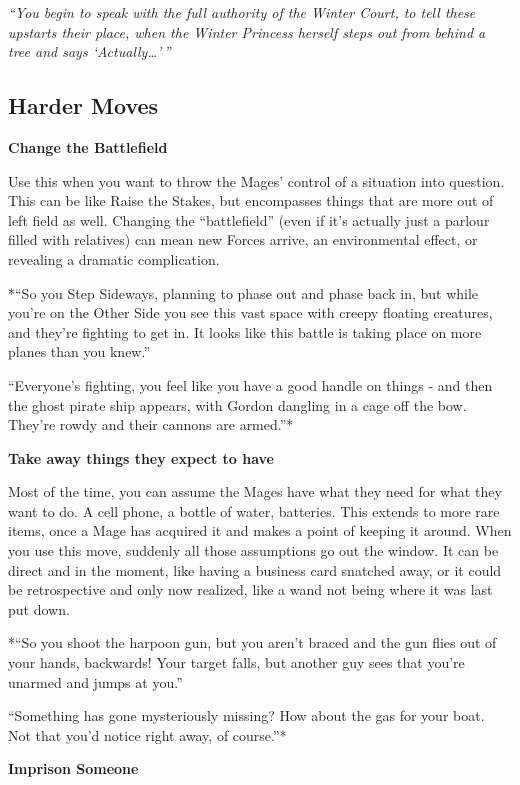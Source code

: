 \documentclass[10pt,twoside,openright]{memoir}
\begin{document}
\emph{``You begin to speak with the full authority of the Winter Court,
to tell these upstarts their place, when the Winter Princess herself
steps out from behind a tree and says `Actually\ldots{}'\,''}

\hypertarget{harder-moves}{%
\subsection{Harder Moves}\label{harder-moves}}

\textbf{Change the Battlefield}

Use this when you want to throw the Mages' control of a situation into
question. This can be like Raise the Stakes, but encompasses things that
are more out of left field as well. Changing the ``battlefield'' (even
if it's actually just a parlour filled with relatives) can mean new
Forces arrive, an environmental effect, or revealing a dramatic
complication.

*``So you Step Sideways, planning to phase out and phase back in, but
while you're on the Other Side you see this vast space with creepy
floating creatures, and they're fighting to get in. It looks like this
battle is taking place on more planes than you knew.''

``Everyone's fighting, you feel like you have a good handle on things -
and then the ghost pirate ship appears, with Gordon dangling in a cage
off the bow. They're rowdy and their cannons are armed.''*

\textbf{Take away things they expect to have}

Most of the time, you can assume the Mages have what they need for what
they want to do. A cell phone, a bottle of water, batteries. This
extends to more rare items, once a Mage has acquired it and makes a
point of keeping it around. When you use this move, suddenly all those
assumptions go out the window. It can be direct and in the moment, like
having a business card snatched away, or it could be retrospective and
only now realized, like a wand not being where it was last put down.

*``So you shoot the harpoon gun, but you aren't braced and the gun flies
out of your hands, backwards! Your target falls, but another guy sees
that you're unarmed and jumps at you.''

``Something has gone mysteriously missing? How about the gas for your
boat. Not that you'd notice right away, of course.''*

\textbf{Imprison Someone}
\end{document}
